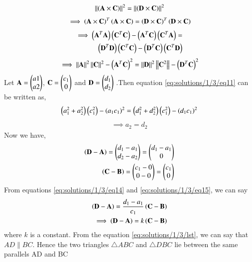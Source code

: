 \begin{align}
    \left\lVert\left(\mathbf{A} \times \mathbf{C}\right)\right\rVert^2 = \left\lVert\left(\mathbf{D} \times \mathbf{C}\right)\right\rVert^2
\end{align}
\begin{align}
    \implies\left(\mathbf{A}\times\mathbf{C}\right)^T \left(\mathbf{A}\times\mathbf{C}\right) = \left(\mathbf{D}\times\mathbf{C}\right)^T \left(\mathbf{D}\times\mathbf{C}\right)
\end{align}
\begin{align}
    \implies \left(\mathbf{A}^T\mathbf{A}\right)\left(\mathbf{C}^T\mathbf{C}\right) - \left(\mathbf{A}^T\mathbf{C}\right)\left(\mathbf{C}^T\mathbf{A}\right) =\\ \left(\mathbf{D}^T\mathbf{D}\right)\left(\mathbf{C}^T\mathbf{C}\right) - \left(\mathbf{D}^T\mathbf{C}\right)\left(\mathbf{C}^T\mathbf{D}\right)
\end{align}
\begin{align}
    \label{eq:solutions/1/3/eq11}
    \implies\left\lVert\mathbf{A}\right\rVert^2\left\lVert\mathbf{C}\right\rVert^2 - \left(\mathbf{A}^T\mathbf{C}\right)^2 = \left\lVert\mathbf{D}\right\rVert^2\left\lVert\mathbf{C}^2\right\rVert - \left(\mathbf{D}^T\mathbf{C}\right)^2 
\end{align}
Let $\mathbf{A}=\begin{pmatrix}a1\\a2\end{pmatrix}$, $\mathbf{C}=\begin{pmatrix}c_1\\0\end{pmatrix}$ and $\mathbf{D}=\begin{pmatrix}d_1\\d_2\end{pmatrix}$ .Then equation \eqref{eq:solutions/1/3/eq11} can be written as,
\begin{align}
    \label{eq:solutions/1/3/lbo}
    \left(a_1^2+a_2^2\right)\left(c_1^2\right)-\left(a_1c_1\right)^2 = \left(d_1^2+d_2^2\right)\left(c_1^2\right) - \left(d_1c_1\right)^2
\end{align}
\begin{align}
    \implies a_2 = d_2
\end{align}
Now we have,
\begin{align}
    \label{eq:solutions/1/3/eq14}
    \left(\mathbf{D}-\mathbf{A}\right)=\begin{pmatrix}d_1-a_1\\d_2-a_2\end{pmatrix} = \begin{pmatrix}d_1-a_1\\0\end{pmatrix}\\ 
    \label{eq:solutions/1/3/eq15}
    \left(\mathbf{C}-\mathbf{B}\right) = \begin{pmatrix}c_1-0 \\ 0-0\end{pmatrix} = \begin{pmatrix}c_1 \\ 0\end{pmatrix}
\end{align}
From equations \eqref{eq:solutions/1/3/eq14} and \eqref{eq:solutions/1/3/eq15}, we can say
\begin{align}
    \left(\mathbf{D}-\mathbf{A}\right)=\frac{d_1-a_1}{c_1}\left(\mathbf{C}-\mathbf{B}\right)\\
    \label{eq:solutions/1/3/lst}
    \implies \left(\mathbf{D}-\mathbf{A}\right)=k\left(\mathbf{C}-\mathbf{B}\right)
\end{align}
where $k$ is a constant. From the equation \eqref{eq:solutions/1/3/lst}, we can say that $AD \parallel BC$. Hence the two triangles $\triangle ABC$ and $\triangle DBC$ lie between the same parallels AD and BC
